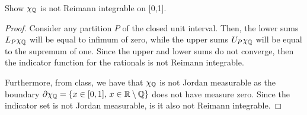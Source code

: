 \documentclass[../hw7]{subfiles}
\begin{document}
\begin{problem}[1]
Show $\chi_{\mathbb{Q}}$ is not Reimann integrable on [0,1].
\end{problem}
\begin{proof}
	Consider any partition $P$ of the closed unit interval.
	Then, the lower sums $L_P \chi_{\mathbb{Q}}$ will be equal to infimum of zero, while the upper sums $U_P \chi_{\mathbb{Q}}$ will be equal to the supremum of one.
	Since the upper and lower sums do not converge, then the indicator function for the rationals is not Reimann integrable.

	Furthermore, from class, we have that $\chi_{\mathbb{Q}}$ is not Jordan measurable as the boundary $\partial{\chi_{\ensuremath{\mathbb{Q}}}} = \{x \in [0,1],\, x \in \mathbb{R}\setminus\mathbb{Q}\} $ does not have measure zero. Since the indicator set is not Jordan measurable, is it also not Reimann integrable.
\end{proof}
\end{document}
